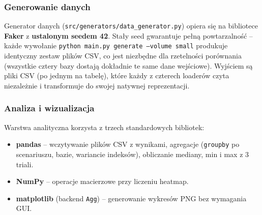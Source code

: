 \subsubsection*{Generowanie danych}

Generator danych (\texttt{src/generators/data\_generator.py}) opiera się na
bibliotece \textbf{Faker} z \textbf{ustalonym seedem 42}.
Stały seed gwarantuje pełną powtarzalność -- każde wywołanie
\texttt{python main.py generate --volume small} produkuje identyczny
zestaw plików CSV, co jest niezbędne dla rzetelności porównania (wszystkie cztery bazy
dostają dokładnie te same dane wejściowe). Wyjściem są pliki CSV
(po jednym na tabelę), które każdy z czterech loaderów czyta niezależnie
i transformuje do swojej natywnej reprezentacji.

\subsubsection*{Analiza i wizualizacja}

Warstwa analityczna korzysta z trzech standardowych bibliotek:

\begin{itemize}
    \item \textbf{pandas} -- wczytywanie plików CSV z wynikami, agregacje
    (\texttt{groupby} po scenariuszu, bazie, wariancie indeksów), obliczanie
    mediany, min i max z 3 triali.
    \item \textbf{NumPy} -- operacje macierzowe przy liczeniu heatmap.
    \item \textbf{matplotlib} (backend \texttt{Agg}) -- generowanie wykresów PNG
    bez wymagania GUI.
\end{itemize}


